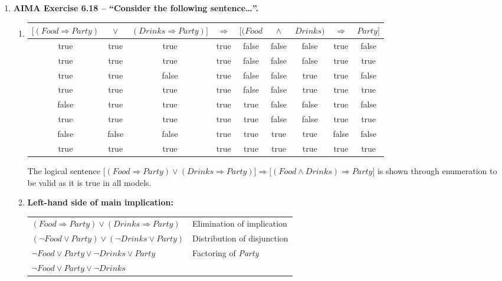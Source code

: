 \begin{enumerate}
\item \textbf{AIMA Exercise 6.18 -- ``Consider the following sentence\ldots''.}

\newcommand{\F}{{\color{WildStrawberry}\small false}}
\newcommand{\T}{{\color{YellowGreen}\small true}}

\begin{enumerate}

\item
\begin{tabular}{ccc|c|ccccc}
$\big[(\textit{Food} \Rightarrow \textit{Party})$ & $\lor$ & $(\textit{Drinks} \Rightarrow \textit{Party})\big]$ & $\Rightarrow$ & $\big[(\textit{Food}$ & $\land$ & $\textit{Drinks})$ & $\Rightarrow$ & $\textit{Party}\big]$ \\
\hline
\T & \T & \T & \T & \F & \F & \F & \T & \F \\
\T & \T & \T & \T & \F & \F & \F & \T & \T \\
\T & \T & \F & \T & \F & \F & \T & \T & \F \\
\T & \T & \T & \T & \F & \F & \T & \T & \T \\
\F & \T & \T & \T & \T & \F & \F & \T & \F \\
\T & \T & \T & \T & \T & \F & \F & \T & \T \\
\F & \F & \F & \T & \T & \T & \T & \F & \F \\
\T & \T & \T & \T & \T & \T & \T & \T & \T \\
\end{tabular}

The logical sentence $\big[(\textit{Food} \Rightarrow \textit{Party}) \lor (\textit{Drinks} \Rightarrow \textit{Party})\big] \Rightarrow \big[(\textit{Food} \land \textit{Drinks}) \Rightarrow \textit{Party}\big]$ is shown through enumeration to be valid as it is true in all models.

\item

\textbf{Left-hand side of main implication:}

\begin{tabular}{ll}
$(\textit{Food} \Rightarrow \textit{Party}) \lor (\textit{Drinks} \Rightarrow \textit{Party})$ & Elimination of implication\\
$(\neg \textit{Food} \lor \textit{Party}) \lor (\neg \textit{Drinks} \lor \textit{Party})$ & Distribution of disjunction\\
$\neg \textit{Food} \lor \textit{Party} \lor \neg \textit{Drinks} \lor \textit{Party}$ & Factoring of \textit{Party}\\
$\neg Food \lor \textit{Party} \lor \neg \textit{Drinks}$ & \\
\end{tabular}


\end{enumerate}
\end{enumerate}
